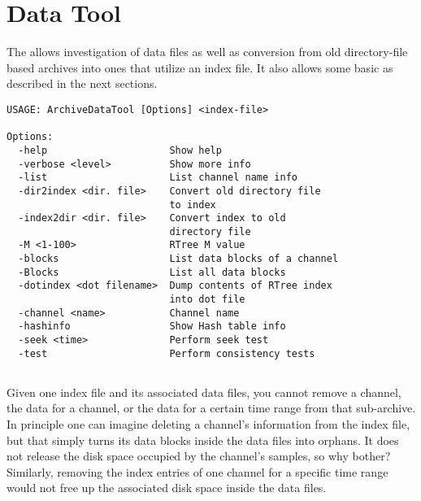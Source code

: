 \section{Data Tool} \label{sec:datatool}

The  allows investigation of data files as well as
conversion from old directory-file based archives into ones that
utilize an index file.
It also allows some basic  as described in the next
sections.

\begin{lstlisting}[frame=none,keywordstyle=\sffamily] 
USAGE: ArchiveDataTool [Options] <index-file>
 
Options:
  -help                     Show help
  -verbose <level>          Show more info
  -list                     List channel name info
  -dir2index <dir. file>    Convert old directory file
                            to index
  -index2dir <dir. file>    Convert index to old
                            directory file
  -M <1-100>                RTree M value
  -blocks                   List data blocks of a channel
  -Blocks                   List all data blocks
  -dotindex <dot filename>  Dump contents of RTree index
                            into dot file
  -channel <name>           Channel name
  -hashinfo                 Show Hash table info
  -seek <time>              Perform seek test
  -test                     Perform consistency tests
\end{lstlisting}

\subsection{} \label{sec:deleteDataFromArchive}
Given one index file and its associated data files, you cannot remove
a channel, the data for a channel, or the data for a certain time
range from that sub-archive. In principle one can imagine deleting a
channel's information from the index file, but that simply turns its
data blocks inside the data files into orphans. It does not release
the disk space occupied by the channel's samples, so why bother?
Similarly, removing the index entries of one channel for a specific
time range would not free up the associated disk space inside the data
files.

